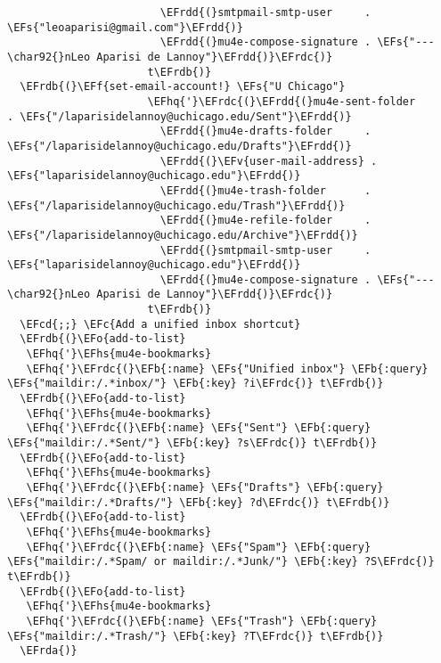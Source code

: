 \documentclass[12pt]{article}
\theoremstyle{plain}%
\theoremstyle{definition}
\theoremstyle{remark}
\newcommand{\EFc}[1]{\textcolor{EFc}{#1}} %
\newcommand{\EFcd}[1]{\textcolor{EFcd}{#1}} %
\newcommand{\EFs}[1]{\textcolor{EFs}{#1}} %
\newcommand{\EFb}[1]{\textcolor{EFb}{#1}} %
\newcommand{\EFf}[1]{\textcolor{EFf}{#1}} %
\newcommand{\EFv}[1]{\textcolor{EFv}{#1}} %
\newcommand{\EFo}[1]{\textcolor{EFo}{#1}} %
\newcommand{\EFhq}[1]{\textcolor{EFhq}{#1}} %
\newcommand{\EFhs}[1]{\textcolor{EFhs}{#1}} %
\newcommand{\EFrda}[1]{\textcolor{EFrda}{#1}} %
\newcommand{\EFrdb}[1]{\textcolor{EFrdb}{#1}} %
\newcommand{\EFrdc}[1]{\textcolor{EFrdc}{#1}} %
\newcommand{\EFrdd}[1]{\textcolor{EFrdd}{#1}} %
\begin{document}
\begin{Code}
\begin{Verbatim}
                        \EFrdd{(}smtpmail-smtp-user     . \EFs{"leoaparisi@gmail.com"}\EFrdd{)}
                        \EFrdd{(}mu4e-compose-signature . \EFs{"---\char92{}nLeo Aparisi de Lannoy"}\EFrdd{)}\EFrdc{)}
                      t\EFrdb{)}
  \EFrdb{(}\EFf{set-email-account!} \EFs{"U Chicago"}
                      \EFhq{'}\EFrdc{(}\EFrdd{(}mu4e-sent-folder       . \EFs{"/laparisidelannoy@uchicago.edu/Sent"}\EFrdd{)}
                        \EFrdd{(}mu4e-drafts-folder     . \EFs{"/laparisidelannoy@uchicago.edu/Drafts"}\EFrdd{)}
                        \EFrdd{(}\EFv{user-mail-address} . \EFs{"laparisidelannoy@uchicago.edu"}\EFrdd{)}
                        \EFrdd{(}mu4e-trash-folder      . \EFs{"/laparisidelannoy@uchicago.edu/Trash"}\EFrdd{)}
                        \EFrdd{(}mu4e-refile-folder     . \EFs{"/laparisidelannoy@uchicago.edu/Archive"}\EFrdd{)}
                        \EFrdd{(}smtpmail-smtp-user     . \EFs{"laparisidelannoy@uchicago.edu"}\EFrdd{)}
                        \EFrdd{(}mu4e-compose-signature . \EFs{"---\char92{}nLeo Aparisi de Lannoy"}\EFrdd{)}\EFrdc{)}
                      t\EFrdb{)}
  \EFcd{;;} \EFc{Add a unified inbox shortcut}
  \EFrdb{(}\EFo{add-to-list}
   \EFhq{'}\EFhs{mu4e-bookmarks}
   \EFhq{'}\EFrdc{(}\EFb{:name} \EFs{"Unified inbox"} \EFb{:query} \EFs{"maildir:/.*inbox/"} \EFb{:key} ?i\EFrdc{)} t\EFrdb{)}
  \EFrdb{(}\EFo{add-to-list}
   \EFhq{'}\EFhs{mu4e-bookmarks}
   \EFhq{'}\EFrdc{(}\EFb{:name} \EFs{"Sent"} \EFb{:query} \EFs{"maildir:/.*Sent/"} \EFb{:key} ?s\EFrdc{)} t\EFrdb{)}
  \EFrdb{(}\EFo{add-to-list}
   \EFhq{'}\EFhs{mu4e-bookmarks}
   \EFhq{'}\EFrdc{(}\EFb{:name} \EFs{"Drafts"} \EFb{:query} \EFs{"maildir:/.*Drafts/"} \EFb{:key} ?d\EFrdc{)} t\EFrdb{)}
  \EFrdb{(}\EFo{add-to-list}
   \EFhq{'}\EFhs{mu4e-bookmarks}
   \EFhq{'}\EFrdc{(}\EFb{:name} \EFs{"Spam"} \EFb{:query} \EFs{"maildir:/.*Spam/ or maildir:/.*Junk/"} \EFb{:key} ?S\EFrdc{)} t\EFrdb{)}
  \EFrdb{(}\EFo{add-to-list}
   \EFhq{'}\EFhs{mu4e-bookmarks}
   \EFhq{'}\EFrdc{(}\EFb{:name} \EFs{"Trash"} \EFb{:query} \EFs{"maildir:/.*Trash/"} \EFb{:key} ?T\EFrdc{)} t\EFrdb{)}
  \EFrda{)}
\end{Verbatim}
\end{Code}
\end{document}
